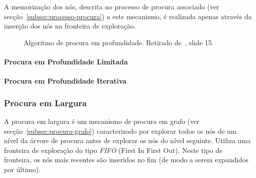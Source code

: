 A memorização dos nós, descrita no processo de procura associado (ver secção~\ref{subsec:processo-procura}) a este mecanismo, é realizada apenas através da inserção dos nós na fronteira de exploração.

\begin{figure}[H]
    \begin{center}
    \end{center}
    \caption{Algoritmo de procura em profundidade. Retirado de~\cite{isel:iasa:slides:proc-espaco-estados-parte-1}, slide 15.}
    \label{fig:alg-proc-profundidade}
\end{figure}

\paragraph{Procura em Profundidade Limitada}\label{par:procura-profundidade-limitada}

\paragraph{Procura em Profundidade Iterativa}\label{par:procura-profundidade-iterativa}

\subsubsection{Procura em Largura}\label{subsubsec:procura-largura}

A procura em largura é um mecanismo de procura em grafo (ver secção~\ref{subsec:procura-grafo}) caracterizado por explorar todos os nós de um nível da árvore de procura antes de explorar os nós do nível seguinte. Utiliza uma fronteira de exploração do tipo \textit{FIFO} (First In First Out). Neste tipo de fronteira, os nós mais recentes são inseridos no fim (de modo a serem expandidos por último).


